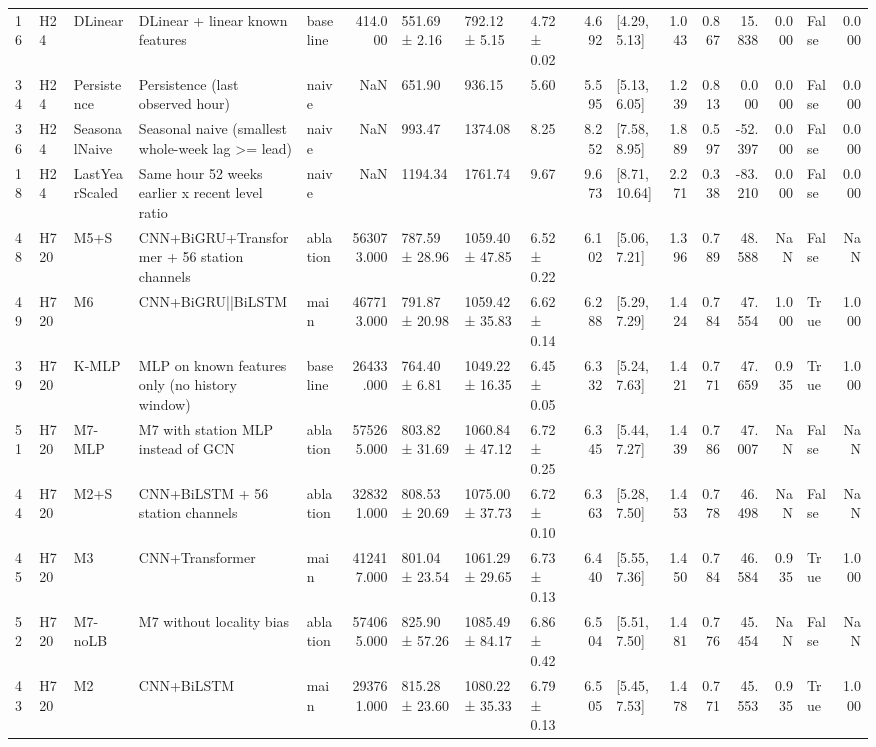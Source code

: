 \begin{tabular}{lllllrlllrlrrrrlr}
16 & H24 & DLinear & DLinear + linear known features & baseline & 414.000 & 551.69 ± 2.16 & 792.12 ± 5.15 & 4.72 ± 0.02 & 4.692 & [4.29, 5.13] & 1.043 & 0.867 & 15.838 & 0.000 & False & 0.000 \\
34 & H24 & Persistence & Persistence (last observed hour) & naive & NaN & 651.90 & 936.15 & 5.60 & 5.595 & [5.13, 6.05] & 1.239 & 0.813 & 0.000 & 0.000 & False & 0.000 \\
36 & H24 & SeasonalNaive & Seasonal naive (smallest whole-week lag >= lead) & naive & NaN & 993.47 & 1374.08 & 8.25 & 8.252 & [7.58, 8.95] & 1.889 & 0.597 & -52.397 & 0.000 & False & 0.000 \\
18 & H24 & LastYearScaled & Same hour 52 weeks earlier x recent level ratio & naive & NaN & 1194.34 & 1761.74 & 9.67 & 9.673 & [8.71, 10.64] & 2.271 & 0.338 & -83.210 & 0.000 & False & 0.000 \\
48 & H720 & M5+S & CNN+BiGRU+Transformer + 56 station channels & ablation & 563073.000 & 787.59 ± 28.96 & 1059.40 ± 47.85 & 6.52 ± 0.22 & 6.102 & [5.06, 7.21] & 1.396 & 0.789 & 48.588 & NaN & False & NaN \\
49 & H720 & M6 & CNN+BiGRU||BiLSTM & main & 467713.000 & 791.87 ± 20.98 & 1059.42 ± 35.83 & 6.62 ± 0.14 & 6.288 & [5.29, 7.29] & 1.424 & 0.784 & 47.554 & 1.000 & True & 1.000 \\
39 & H720 & K-MLP & MLP on known features only (no history window) & baseline & 26433.000 & 764.40 ± 6.81 & 1049.22 ± 16.35 & 6.45 ± 0.05 & 6.332 & [5.24, 7.63] & 1.421 & 0.771 & 47.659 & 0.935 & True & 1.000 \\
51 & H720 & M7-MLP & M7 with station MLP instead of GCN & ablation & 575265.000 & 803.82 ± 31.69 & 1060.84 ± 47.12 & 6.72 ± 0.25 & 6.345 & [5.44, 7.27] & 1.439 & 0.786 & 47.007 & NaN & False & NaN \\
44 & H720 & M2+S & CNN+BiLSTM + 56 station channels & ablation & 328321.000 & 808.53 ± 20.69 & 1075.00 ± 37.73 & 6.72 ± 0.10 & 6.363 & [5.28, 7.50] & 1.453 & 0.778 & 46.498 & NaN & False & NaN \\
45 & H720 & M3 & CNN+Transformer & main & 412417.000 & 801.04 ± 23.54 & 1061.29 ± 29.65 & 6.73 ± 0.13 & 6.440 & [5.55, 7.36] & 1.450 & 0.784 & 46.584 & 0.935 & True & 1.000 \\
52 & H720 & M7-noLB & M7 without locality bias & ablation & 574065.000 & 825.90 ± 57.26 & 1085.49 ± 84.17 & 6.86 ± 0.42 & 6.504 & [5.51, 7.50] & 1.481 & 0.776 & 45.454 & NaN & False & NaN \\
43 & H720 & M2 & CNN+BiLSTM & main & 293761.000 & 815.28 ± 23.60 & 1080.22 ± 35.33 & 6.79 ± 0.13 & 6.505 & [5.45, 7.53] & 1.478 & 0.771 & 45.553 & 0.935 & True & 1.000 \\

\end{tabular}
